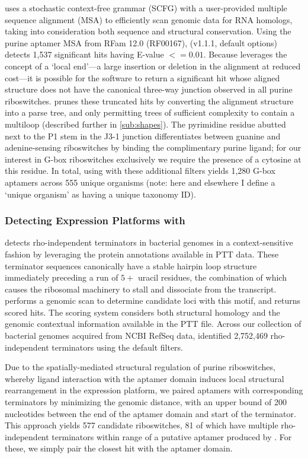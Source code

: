 \infernal uses a stochastic context-free grammar (SCFG) with a user-provided multiple sequence alignment (MSA) to efficiently scan genomic data for RNA homologs, taking into consideration both sequence and structural conservation. Using the purine aptamer MSA from RFam 12.0 (RF00167), \infernal (v1.1.1, default options) detects 1,537 significant hits having E-value $<= 0.01$. Because \infernal leverages the concept of a `local end'---a large insertion or deletion in the alignment at reduced cost---it is possible for the software to return a significant hit whose aligned structure does not have the canonical three-way junction observed in all purine riboswitches. \rfinder prunes these truncated \infernal hits by converting the alignment structure into a parse tree, and only permitting trees of sufficient complexity to contain a multiloop (described further in \ref{sub:shapes}). The pyrimidine residue abutted next to the P1 stem in the J3-1 junction differentiates between guanine and adenine-sensing riboswitches by binding the complimentary purine ligand; for our interest in G-box riboswitches exclusively we require the presence of a cytosine at this residue. In total, using \infernal with these additional filters yields 1,280 G-box aptamers across 555 unique organisms (note: here and elsewhere I define a `unique organism' as having a unique taxonomy ID).

\subsubsection{Detecting Expression Platforms with \tthp} \label{ssub:tthp}

\tthp detects rho-independent terminators in bacterial genomes in a context-sensitive fashion by leveraging the protein annotations available in PTT data. These terminator sequences canonically have a stable hairpin loop structure immediately preceding a run of $5+$ uracil residues, the combination of which causes the ribosomal machinery to stall and dissociate from the transcript. \tthp performs a genomic scan to determine candidate loci with this motif, and returns scored hits. The scoring system considers both structural homology and the genomic contextual information available in the PTT file. Across our collection of bacterial genomes acquired from NCBI RefSeq data, \tthp identified 2,752,469 rho-independent terminators using the default filters.

Due to the spatially-mediated structural regulation of purine riboswitches, whereby ligand interaction with the aptamer domain induces local structural rearrangement in the expression platform, we paired aptamers with corresponding terminators by minimizing the genomic distance, with an upper bound of 200 nucleotides between the end of the aptamer domain and start of the terminator. This approach yields 577 candidate riboswitches, 81 of which have multiple rho-independent terminators within range of a putative aptamer produced by \infernal. For these, we simply pair the closest \tthp hit with the aptamer domain.


